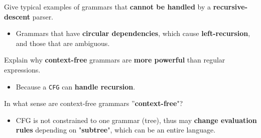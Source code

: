 \documentclass[11pt]{beamer}
\begin{document}
\begin{frame}

\begin{block}{Give typical examples of grammars that \textbf{cannot be handled} by a \textbf{recursive-descent} parser.}
\begin{itemize}
\item Grammars that have \textbf{circular dependencies}, which cause \textbf{left-recursion}, and those that are ambiguous.
\end{itemize}
\end{block}


\begin{block}{Explain why \textbf{context-free} grammars are \textbf{more powerful} than regular expressions.}
\begin{itemize}
\item Because a \texttt{CFG} can \textbf{handle recursion}.
\end{itemize}
\end{block}


\begin{block}{In what sense are context-free grammars ”\textbf{context-free}"?}
\begin{itemize}
\item CFG is not constrained to one grammar (tree), thus may \textbf{change evaluation rules} depending on "\textbf{subtree}", which can be an entire language.
\end{itemize}
\end{block}

\end{frame}
\end{document}

